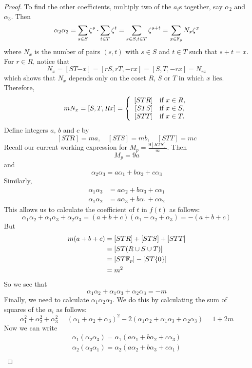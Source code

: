 \begin{proof}
To find the other coefficients, multiply two of the $a_i$s together, say $\alpha_2$ and $\alpha_3$.
Then
$$\alpha_2 \alpha_3 = \sum_{s\in S} \zeta^s \cdot \sum_{t\in T}\zeta^t=\sum_{s \in S, t\in T}\zeta^{s+t} = \sum_{x\in \mathbb{F}_p}N_x \zeta^x$$
where $N_x$ is the number of pairs $(s,t)$ with $s \in S$ and $t \in T$ such that $s+t=x$.
For $r \in R$, notice that
$$N_x = [ST{-x}] = [rS,rT,{-rx}]=[S,T,{-rx}]=N_{rx}$$
which shows that $N_x$ depends only on the coset $R$, $S$ or $T$ in which $x$ lies.
Therefore,
\begin{equation*}
	mN_x = [S,T,Rx] = \left\{
		\begin{array}{rl}
			{[STR]} & \text{if } x \in R,\\
			{[STS]} & \text{if } x \in S,\\
			{[STT]} & \text{if } x \in T.
		\end{array}
		\right.
\end{equation*}
Define integers $a$, $b$ and $c$ by
$$[STR] = ma,\quad [STS] = mb,\quad [STT] = mc$$
Recall our current working expression for $M_p=\frac{9[RTS]}{m}$.
Then
$$M_p = 9a$$
and
$$\alpha_2\alpha_3 = a\alpha_1 + b\alpha_2 + c\alpha_3$$
Similarly,
\begin{align*}
	\alpha_1\alpha_3 &= a\alpha_2 + b\alpha_3 + c\alpha_1\\
	\alpha_1\alpha_2 &= a\alpha_3 + b\alpha_1 + c\alpha_2
\end{align*}
This allows us to calculate the coefficient of $t$ in $f(t)$ as follows:
$$\alpha_1\alpha_2 +\alpha_1\alpha_3 +\alpha_2\alpha_3 = (a + b + c)(\alpha_1 + \alpha_2 + \alpha_3) = -(a + b + c)$$
But
\begin{align*}
	m(a + b + c) &= [STR] + [STS] + [STT]\\
		     &= [ST(R\cup S\cup T)]\\
	      &= [ST\mathbb{F}_p] - [ST\{0\}]\\
	      &= m^2
\end{align*}
So we see that
$$\alpha_1\alpha_2 +\alpha_1\alpha_3 +\alpha_2\alpha_3 = -m$$
Finally, we need to calculate $\alpha_1\alpha_2\alpha_3$.
We do this by calculating the sum of squares of the $\alpha_i$ as follows:
$$\alpha_1^2 + \alpha_2^2 + \alpha_3^2 = (\alpha_1 + \alpha_2 + \alpha_3)^2 - 2(\alpha_1\alpha_2 +\alpha_1\alpha_3 +\alpha_2\alpha_3) = 1 + 2m$$
Now we can write
\begin{align*}
	\alpha_1 (\alpha_2 \alpha_3) = \alpha_1 (a\alpha_1 + b\alpha_2 + c\alpha_3)\\
	\alpha_2 (\alpha_3 \alpha_1) = \alpha_2 (a\alpha_2 + b\alpha_3 + c\alpha_1)\\

\end{align*}
\end{proof}
